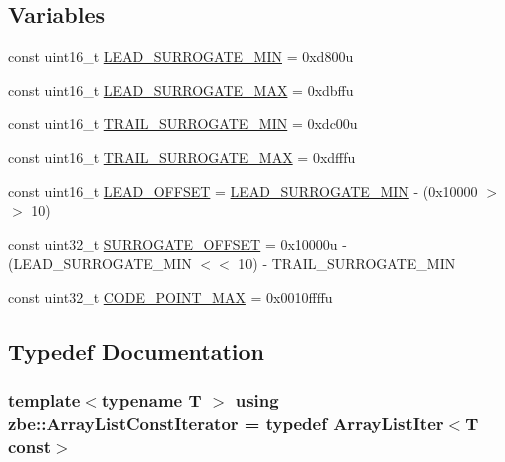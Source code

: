 \subsection*{Variables}
\begin{DoxyCompactItemize}
\item 
const uint16\+\_\+t \hyperlink{namespacezbe_ade15aa1a63520ce8b98ea85ea838453e}{L\+E\+A\+D\+\_\+\+S\+U\+R\+R\+O\+G\+A\+T\+E\+\_\+\+M\+I\+N} = 0xd800u
\item 
const uint16\+\_\+t \hyperlink{namespacezbe_a834003cf73290548f7010b40b160a329}{L\+E\+A\+D\+\_\+\+S\+U\+R\+R\+O\+G\+A\+T\+E\+\_\+\+M\+A\+X} = 0xdbffu
\item 
const uint16\+\_\+t \hyperlink{namespacezbe_abe0fe1fa2e911637fa7bbf8df43a50f5}{T\+R\+A\+I\+L\+\_\+\+S\+U\+R\+R\+O\+G\+A\+T\+E\+\_\+\+M\+I\+N} = 0xdc00u
\item 
const uint16\+\_\+t \hyperlink{namespacezbe_a046d90a4a14bcf0b439a6be2082ddd3b}{T\+R\+A\+I\+L\+\_\+\+S\+U\+R\+R\+O\+G\+A\+T\+E\+\_\+\+M\+A\+X} = 0xdfffu
\item 
const uint16\+\_\+t \hyperlink{namespacezbe_a6402cf0e195d586a56e170600d540e11}{L\+E\+A\+D\+\_\+\+O\+F\+F\+S\+E\+T} = \hyperlink{namespacezbe_ade15aa1a63520ce8b98ea85ea838453e}{L\+E\+A\+D\+\_\+\+S\+U\+R\+R\+O\+G\+A\+T\+E\+\_\+\+M\+I\+N} -\/ (0x10000 $>$$>$ 10)
\item 
const uint32\+\_\+t \hyperlink{namespacezbe_a84ab9fa319a6700376e4c409444c3b2b}{S\+U\+R\+R\+O\+G\+A\+T\+E\+\_\+\+O\+F\+F\+S\+E\+T} = 0x10000u -\/ (\+L\+E\+A\+D\+\_\+\+S\+U\+R\+R\+O\+G\+A\+T\+E\+\_\+\+M\+I\+N $<$$<$ 10) -\/ T\+R\+A\+I\+L\+\_\+\+S\+U\+R\+R\+O\+G\+A\+T\+E\+\_\+\+M\+I\+N
\item 
const uint32\+\_\+t \hyperlink{namespacezbe_a22d672605de5842ffd69d3f0741c85fa}{C\+O\+D\+E\+\_\+\+P\+O\+I\+N\+T\+\_\+\+M\+A\+X} = 0x0010ffffu
\end{DoxyCompactItemize}


\subsection{Typedef Documentation}
\hypertarget{namespacezbe_ad150b3b2832337d2dce4e58c3fe7da58}{}
\subsubsection[{Array\+List\+Const\+Iterator}]{\setlength{\rightskip}{0pt plus 5cm}template$<$typename T $>$ using {\bf zbe\+::\+Array\+List\+Const\+Iterator} = typedef {\bf Array\+List\+Iter}$<$T const$>$}\label{namespacezbe_ad150b3b2832337d2dce4e58c3fe7da58}


